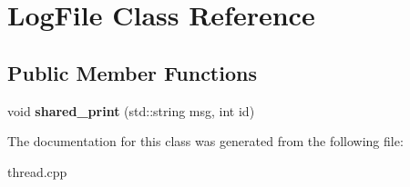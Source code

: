 \hypertarget{classLogFile}{}\section{Log\+File Class Reference}
\label{classLogFile}
\subsection*{Public Member Functions}
\begin{DoxyCompactItemize}
\item 
void {\bfseries shared\+\_\+print} (std\+::string msg, int id)\hypertarget{classLogFile_afd110692f4a29b1b539b8d0df14d4174}{}\label{classLogFile_afd110692f4a29b1b539b8d0df14d4174}

\end{DoxyCompactItemize}


The documentation for this class was generated from the following file\+:\begin{DoxyCompactItemize}
\item 
thread.\+cpp\end{DoxyCompactItemize}
